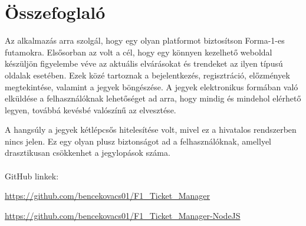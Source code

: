 \chapter*{Összefoglaló}

Az alkalmazás arra szolgál, hogy egy olyan platformot biztosítson Forma-1-es futamokra. Elsősorban az volt a cél, hogy egy könnyen kezelhető weboldal készüljön figyelembe véve az aktuális elvárásokat és trendeket az ilyen típusú oldalak esetében. Ezek közé tartoznak a bejelentkezés, regisztráció, előzmények megtekintése, valamint a jegyek böngészése. A jegyek elektronikus formában való elküldése a felhasználóknak lehetőséget ad arra, hogy mindig és mindehol elérhető legyen, továbbá kevésbé valószínű az elvesztése.

A hangsúly a jegyek kétlépcsős hitelesítése volt, mivel ez a hivatalos rendszerben nincs jelen. Ez egy olyan plusz biztonságot ad a felhasználóknak, amellyel drasztikusan csökkenhet a jegylopások száma.\\ \\

GitHub linkek:

\url{https://github.com/bencekovacs01/F1_Ticket_Manager}

\url{https://github.com/bencekovacs01/F1_Ticket_Manager-NodeJS}